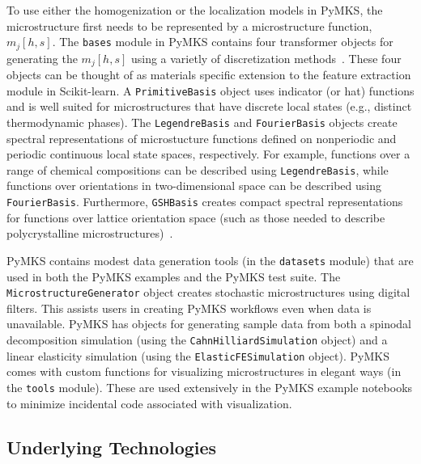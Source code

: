 \documentclass{bmcart}
\begin{document}
To use either the homogenization or the localization models in PyMKS,
the microstructure first needs to be represented by a microstructure
function, $m_j\left[h, s\right]$. The \texttt{bases} module in PyMKS
contains four transformer objects for generating the
$m_j\left[h,s\right]$ using a varietly of discretization
methods~\cite{landi2010multi, kalidindi2010novel,
yabansu2014calibrated, al2012multi, kalidindi2011microstructure,
gupta2015structure, cceccen2014data, brough2016microstructure}.
These four objects can be thought of as materials specific
extension to the feature extraction
module in Scikit-learn. A \texttt{PrimitiveBasis} object uses
indicator (or hat) functions and is well suited for microstructures
that have discrete local states (e.g., distinct thermodynamic
phases). The \texttt{LegendreBasis} and \texttt{FourierBasis} objects
create spectral representations of microstucture functions defined on
nonperiodic and periodic continuous local state spaces,
respectively. For example, functions over a range of chemical
compositions can be described using \texttt{LegendreBasis}, while
functions over orientations in two-dimensional space can be described
using \texttt{FourierBasis}. Furthermore, \texttt{GSHBasis} creates
compact spectral representations for functions over lattice
orientation space (such as those needed to describe polycrystalline
microstructures)~\cite{ kalidindi2006spectral, shaffer2010building,
knezevic2010deformation, al2010spectral, duvvuru2007application,
li2003evolution, li2005texture, li2007processing, li2005processing,
creuziger2014crystallographic, sundararaghavan2008multi,
sundararaghavan2007linear}.

PyMKS contains modest data generation tools (in the \texttt{datasets}
module) that are used in both the PyMKS examples and the PyMKS test
suite. The \texttt{MicrostructureGenerator} object creates stochastic
microstructures using digital filters. This assists users in creating
PyMKS workflows even when data is unavailable. PyMKS has objects for
generating sample data from both a spinodal decomposition simulation
(using the \texttt{CahnHilliardSimulation} object) and a linear
elasticity simulation (using the \texttt{ElasticFESimulation}
object). PyMKS comes with custom functions for visualizing
microstructures in elegant ways (in the \texttt{tools} module). These
are used extensively in the PyMKS example notebooks to minimize
incidental code associated with visualization.

\subsection{Underlying Technologies}
\end{document}
